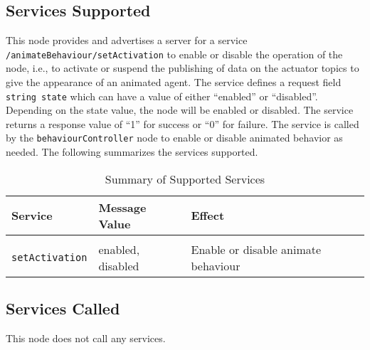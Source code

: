 \documentclass{CSSRforAfrica}
\begin{document}
\subsection*{Services Supported}
This node provides and advertises a server for a service \texttt{/animateBehaviour/setActivation} to enable or disable the operation of the node, i.e., to activate or suspend the publishing of data on the actuator topics to give the appearance of an animated agent. The service defines a request field \texttt{string state} which can have a value of either ``enabled'' or ``disabled''. Depending on the state value, the node will be enabled or disabled. The service returns a response value of ``1'' for success or ``0'' for failure. The service is called by the \texttt{behaviourController} node to enable or disable animated behavior as needed. The following summarizes the services supported.
\begin{longtable}{|>{\raggedright\arraybackslash}p{}|>{\raggedright\arraybackslash}p{}|>{\raggedright\arraybackslash}p{}|}
    \caption{Summary of Supported Services}
    \label{tab:services_supported}\\
    \hline
    \rowcolor{gray!30}
    \textbf{Service} & \textbf{Message Value} & \textbf{Effect} \\ \hline
    \endhead %
    \makecell[l]{\texttt{/animateBehaviour/} \\ \texttt{setActivation}} & enabled, disabled & Enable or disable animate behaviour \\ \hline
\end{longtable}

\subsection*{Services Called}
This node does not call any services.
\end{document}
